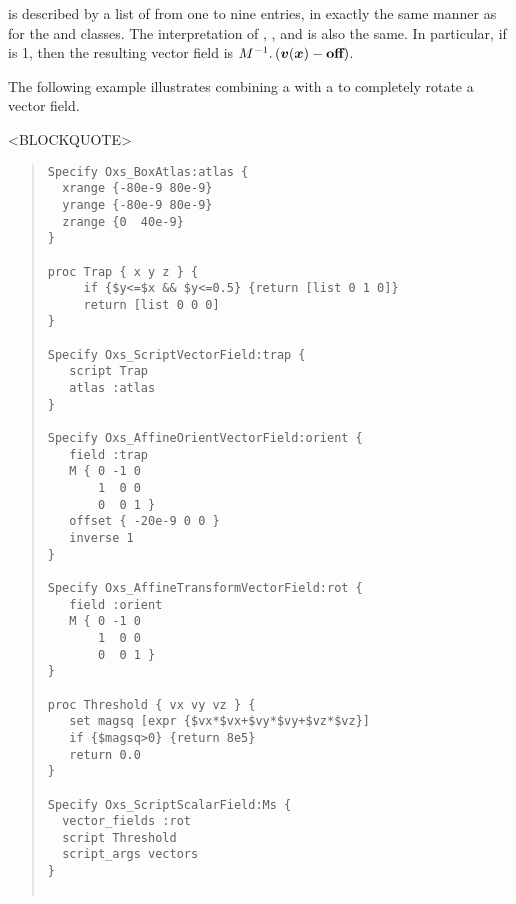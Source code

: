 \begin{description}
 is described by a list of from one to nine entries, in exactly
the same manner as for the
and
classes.  The
interpretation of , , and
 is also the same.  In particular, if
 is 1, then the resulting vector field is
$M^{-1}.\left(\mbox{\boldmath$v$}(\mbox{\boldmath$x$})-\textbf{off}\right)$.

The following example illustrates combining a
 with a
to completely rotate a vector field.
\begin{rawhtml}<BLOCKQUOTE>\end{rawhtml}
\begin{quote}
\begin{verbatim}
Specify Oxs_BoxAtlas:atlas {
  xrange {-80e-9 80e-9}
  yrange {-80e-9 80e-9}
  zrange {0  40e-9}
}

proc Trap { x y z } {
     if {$y<=$x && $y<=0.5} {return [list 0 1 0]}
     return [list 0 0 0]
}

Specify Oxs_ScriptVectorField:trap {
   script Trap
   atlas :atlas
}

Specify Oxs_AffineOrientVectorField:orient {
   field :trap
   M { 0 -1 0
       1  0 0
       0  0 1 }
   offset { -20e-9 0 0 }
   inverse 1
}

Specify Oxs_AffineTransformVectorField:rot {
   field :orient
   M { 0 -1 0
       1  0 0
       0  0 1 }
}

proc Threshold { vx vy vz } {
   set magsq [expr {$vx*$vx+$vy*$vy+$vz*$vz}]
   if {$magsq>0} {return 8e5}
   return 0.0
}

Specify Oxs_ScriptScalarField:Ms {
  vector_fields :rot
  script Threshold
  script_args vectors  
}


\end{verbatim}
\end{quote}
\end{description}

